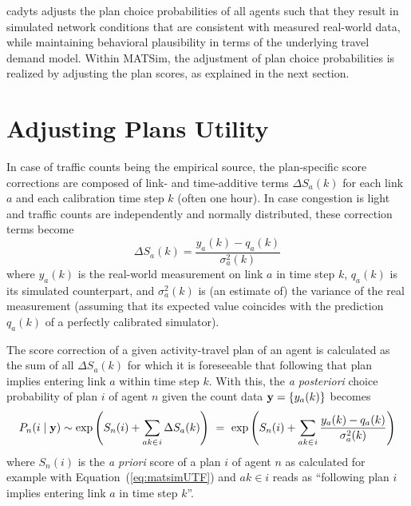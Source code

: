 \gls{cadyts} adjusts the plan choice probabilities of all 
agents such that they result in simulated network conditions that are consistent with 
measured real-world data, while maintaining behavioral 
plausibility in terms of the underlying travel demand model. 
Within MATSim, the adjustment of plan choice probabilities is realized 
by adjusting the plan scores, as explained in the next section.

\section{Adjusting Plans Utility}

In case of traffic counts being the empirical source, the plan-specific score corrections 
are composed of link- and time-additive terms $\Delta S_a(k)$ for each link $a$
and each calibration time step $k$ (often one hour). 
In case congestion is light and traffic counts are independently and normally distributed, 
these correction terms become 
%
\begin{equation}
\label{eq:cadyts:correction}
\Delta S_a(k) = \frac{y_a(k) - q_a(k)} {\sigma_a^2(k)}
\end{equation}
%
where $y_a(k)$ is the real-world measurement on link $a$ in time step $k$, 
$q_a(k)$ is its simulated counterpart, and $\sigma^2_a(k)$ is (an estimate of) 
the variance of the real measurement (assuming that its expected value 
coincides with the prediction $q_a(k)$ of a perfectly calibrated simulator).

The score correction of a given activity-travel plan of an agent is calculated as 
the sum of all $\Delta S_a(k)$ for which it is foreseeable that following that plan 
implies entering link $a$ within time step $k$. 
With this, the \textit{a posteriori} choice probability of plan $i$ of agent $n$ given
the count data ${\bf y} = \{y_a(k)\}$ becomes
%
\begin{equation}
P_n(i\mid{\bf y}) \sim 
\exp\left(S_n(i)+ \sum_{ak\in_{}i} \Delta S_a(k) \right)
\,\,=\,\,
\exp\left(S_n(i)+ \sum_{ak\in_{}i} \frac{y_a(k) - q_a(k)} {\sigma_a^2(k)} \right)
\label{eq:cadyts:selection}
\end{equation}
where $S_n(i)$ is the \textit{a priori} score of a plan $i$ of agent $n$ as 
calculated for example with Equation~(\ref{eq:matsimUTF}) and $ak\in i$ reads as
``following plan $i$ implies entering link $a$ in time step $k$''.

